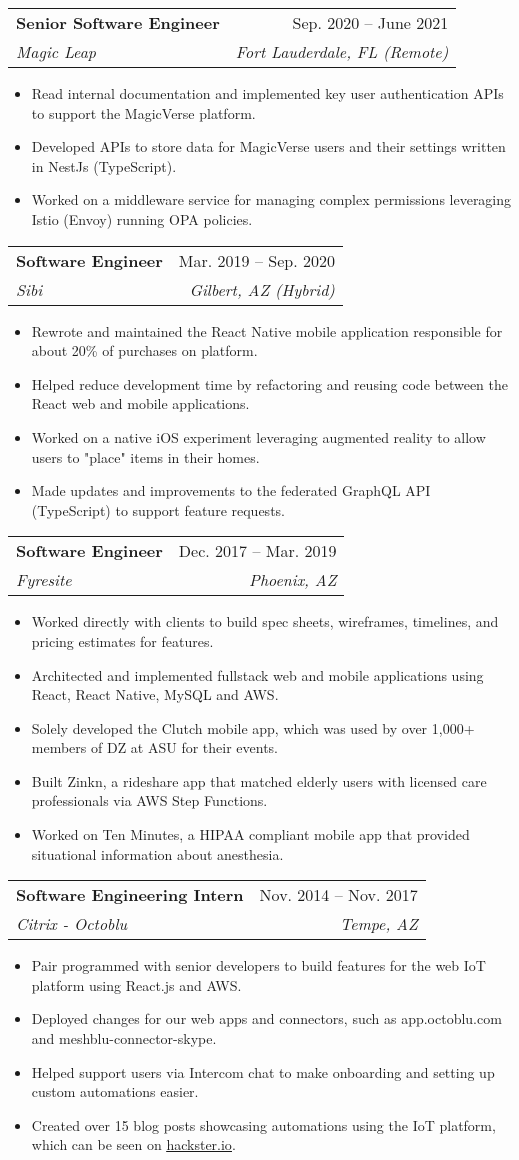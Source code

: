 \documentclass[letterpaper,11pt]{article}
\makeatletter
\newcommand{\resumeItem}[1]{
  \item\small{
    {#1 \vspace{-2pt}}
  }
}
\newcommand{\resumeSubheading}[4]{
  \vspace{-2pt}\item
    \begin{tabular*}{0.97\textwidth}[t]{l@{\extracolsep{\fill}}r}
      \textbf{#1} & #2 \\
      \textit{\small#3} & \textit{\small #4} \\
    \end{tabular*}\vspace{-7pt}
}
\newcommand{\resumeItemListStart}{\begin{itemize}}
\newcommand{\resumeItemListEnd}{\end{itemize}\vspace{-5pt}}
\makeatother
\begin{document}
    \resumeSubheading
      {Senior Software Engineer}{Sep. 2020 -- June 2021}
      {Magic Leap}{Fort Lauderdale, FL (Remote)}
      \resumeItemListStart
        \resumeItem{Read internal documentation and implemented key user authentication APIs to support the MagicVerse platform.}
        \resumeItem{Developed APIs to store data for MagicVerse users and their settings written in NestJs (TypeScript).}
        \resumeItem{Worked on a middleware service for managing complex permissions leveraging Istio (Envoy) running OPA policies.}
      \resumeItemListEnd

    \resumeSubheading
      {Software Engineer}{Mar. 2019 -- Sep. 2020}
      {Sibi}{Gilbert, AZ (Hybrid)}
      \resumeItemListStart
        \resumeItem{Rewrote and maintained the React Native mobile application responsible for about 20\% of purchases on platform.}
        \resumeItem{Helped reduce development time by refactoring and reusing code between the React web and mobile applications.}
        \resumeItem{Worked on a native iOS experiment leveraging augmented reality to allow users to "place" items in their homes.}
        \resumeItem{Made updates and improvements to the federated GraphQL API (TypeScript) to support feature requests.}
      \resumeItemListEnd

    \resumeSubheading
      {Software Engineer}{Dec. 2017 -- Mar. 2019}
      {Fyresite}{Phoenix, AZ}
      \resumeItemListStart
        \resumeItem{Worked directly with clients to build spec sheets, wireframes, timelines, and pricing estimates for features.}
        \resumeItem{Architected and implemented fullstack web and mobile applications using React, React Native, MySQL and AWS.}
        \resumeItem{Solely developed the Clutch mobile app, which was used by over 1,000+ members of DZ at ASU for their events.}
        \resumeItem{Built Zinkn, a rideshare app that matched elderly users with licensed care professionals via AWS Step Functions.}
        \resumeItem{Worked on Ten Minutes, a HIPAA compliant mobile app that provided situational information about anesthesia.}
      \resumeItemListEnd

    \resumeSubheading
      {Software Engineering Intern}{Nov. 2014 -- Nov. 2017}
      {Citrix - Octoblu}{Tempe, AZ}
      \resumeItemListStart
        \resumeItem{Pair programmed with senior developers to build features for the web IoT platform using React.js and AWS.}
        \resumeItem{Deployed changes for our web apps and connectors, such as app.octoblu.com and meshblu-connector-skype.}
        \resumeItem{Helped support users via Intercom chat to make onboarding and setting up custom automations easier.}
        \resumeItem{Created over 15 blog posts showcasing automations using the IoT platform, which can be seen on \href{https://www.hackster.io/andrewstein/}{\underline{hackster.io}}.}
      \resumeItemListEnd
\end{document}
